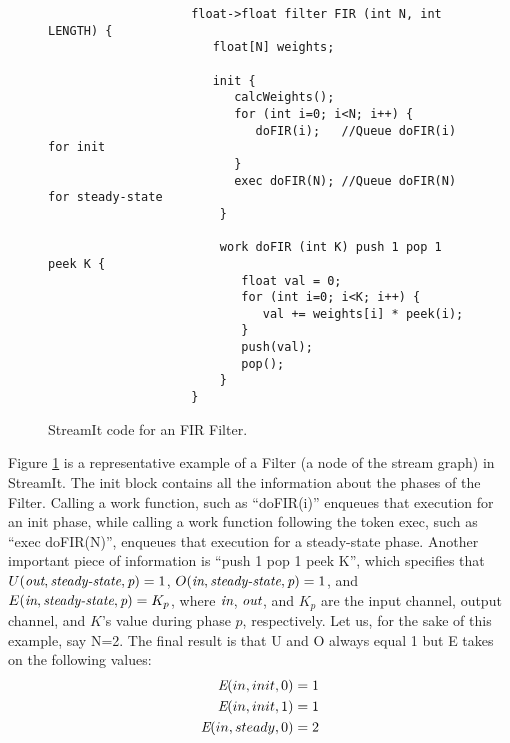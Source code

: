 
\begin{figure}[t]
\begin{verbatim}
                    float->float filter FIR (int N, int LENGTH) {
                       float[N] weights;

                       init {
                          calcWeights();
                          for (int i=0; i<N; i++) {
                             doFIR(i);   //Queue doFIR(i) for init
                          }
                          exec doFIR(N); //Queue doFIR(N) for steady-state
                        }

                        work doFIR (int K) push 1 pop 1 peek K {
                           float val = 0;
                           for (int i=0; i<K; i++) {
                              val += weights[i] * peek(i);
                           }
                           push(val);
                           pop();
                        }
                    }            
\end{verbatim}
\caption{StreamIt code for an FIR Filter.
\protect\label{fig:fir}}
\end{figure}

Figure \ref{fig:fir} is a representative example of a Filter (a node
of the stream graph) in StreamIt. The init block contains all the
information about the phases of the Filter.  Calling a work function,
such as ``doFIR(i)'' enqueues that execution for an init phase, while
calling a work function following the token exec, such as ``exec
doFIR(N)'', enqueues that execution for a steady-state phase. Another
important piece of information is ``push 1 pop 1 peek K'', which
specifies that $U(\mbox{\it out},\mbox{\it steady-state},\mbox{\it p})=1$,
$O(\mbox{\it in},\mbox{\it steady-state},\mbox{\it p})=1$, and
$E(\mbox{\it in},\mbox{\it steady-state},\mbox{\it p})=K_p$, where $\mbox{\it in}$,
$\mbox{\it out}$, and $K_p$ are the input channel, output channel, and $K$'s
value during phase $p$, respectively. Let us, for the sake of this
example, say N=2. The final result is that U and O always equal 1 but
E takes on the following values:
\begin{align}
\mbox{\it E}(in,init,0)&=1\nonumber\\
\mbox{\it E}(in,init,1)&=1\nonumber\\
\mbox{\it E}(in,steady,0)&=2\nonumber
\end{align}

